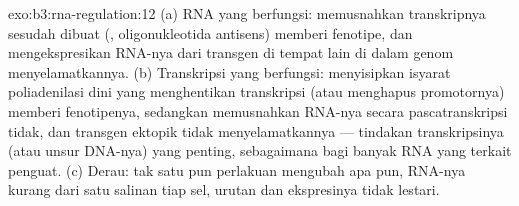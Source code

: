 \begin{solution}{exo:b3:rna-regulation:12}
(a) RNA yang berfungsi: memusnahkan transkripnya sesudah dibuat (,
oligonukleotida antisens) memberi fenotipe, dan mengekspresikan RNA-nya dari
transgen di tempat lain di dalam genom menyelamatkannya. (b) Transkripsi yang
berfungsi: menyisipkan isyarat poliadenilasi dini yang menghentikan
transkripsi (atau menghapus promotornya) memberi fenotipenya, sedangkan
memusnahkan RNA-nya secara pascatranskripsi tidak, dan transgen ektopik tidak
menyelamatkannya --- tindakan transkripsinya (atau unsur DNA-nya) yang
penting, sebagaimana bagi banyak RNA yang terkait penguat. (c) Derau: tak
satu pun perlakuan mengubah apa pun, RNA-nya kurang dari satu salinan tiap
sel, urutan dan ekspresinya tidak lestari.
\end{solution}


